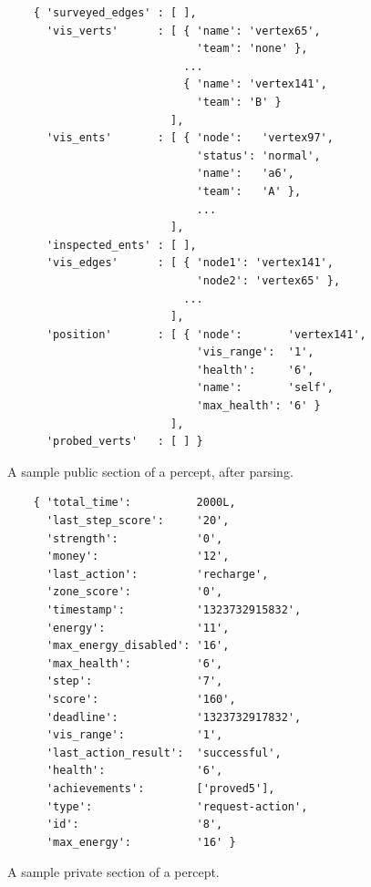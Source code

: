     \begin{figure}
    \centering
    \label{fig:pythonperceptpublic}
    \begin{small}
    \begin{verbatim}
    { 'surveyed_edges' : [ ], 
      'vis_verts'      : [ { 'name': 'vertex65',  
                             'team': 'none' }, 
                           ...
                           { 'name': 'vertex141', 
                             'team': 'B' } 
                         ],  
      'vis_ents'       : [ { 'node':   'vertex97',  
                             'status': 'normal', 
                             'name':   'a6',  
                             'team':   'A' }, 
                             ...
                         ],  
      'inspected_ents' : [ ],  
      'vis_edges'      : [ { 'node1': 'vertex141', 
                             'node2': 'vertex65' }, 
                           ...
                         ], 
      'position'       : [ { 'node':       'vertex141', 
                             'vis_range':  '1', 
                             'health':     '6', 
                             'name':       'self', 
                             'max_health': '6' }
                         ], 
      'probed_verts'   : [ ] }
    \end{verbatim}
    \end{small}
    \caption{A sample public section of a percept, after parsing.}
    \end{figure}

    \begin{figure}
    \centering
    \label{fig:pythonperceptprivate}
    \begin{small}
    \begin{verbatim}
    { 'total_time':          2000L, 
      'last_step_score':     '20', 
      'strength':            '0', 
      'money':               '12', 
      'last_action':         'recharge', 
      'zone_score':          '0', 
      'timestamp':           '1323732915832', 
      'energy':              '11', 
      'max_energy_disabled': '16', 
      'max_health':          '6', 
      'step':                '7', 
      'score':               '160', 
      'deadline':            '1323732917832', 
      'vis_range':           '1', 
      'last_action_result':  'successful', 
      'health':              '6', 
      'achievements':        ['proved5'], 
      'type':                'request-action', 
      'id':                  '8', 
      'max_energy':          '16' }
    \end{verbatim}
    \end{small}
    \caption{A sample private section of a percept.}
    \end{figure}

